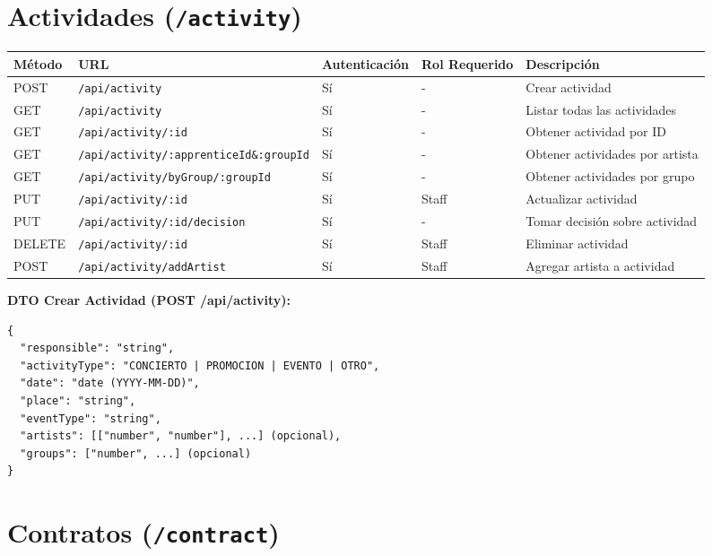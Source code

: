 \documentclass[11pt]{article}
\begin{document}
\section{Actividades (\texttt{/activity})}

\begin{longtable}{lllll}
\toprule
\textbf{Método} & \textbf{URL} & \textbf{Autenticación} & \textbf{Rol Requerido} & \textbf{Descripción} \\
\midrule
\endhead
POST & \texttt{/api/activity} & Sí & - & Crear actividad \\
GET & \texttt{/api/activity} & Sí & - & Listar todas las actividades \\
GET & \texttt{/api/activity/:id} & Sí & - & Obtener actividad por ID \\
GET & \texttt{/api/activity/:apprenticeId\&:groupId} & Sí & - & Obtener actividades por artista \\
GET & \texttt{/api/activity/byGroup/:groupId} & Sí & - & Obtener actividades por grupo \\
PUT & \texttt{/api/activity/:id} & Sí & Staff & Actualizar actividad \\
PUT & \texttt{/api/activity/:id/decision} & Sí & - & Tomar decisión sobre actividad \\
DELETE & \texttt{/api/activity/:id} & Sí & Staff & Eliminar actividad \\
POST & \texttt{/api/activity/addArtist} & Sí & Staff & Agregar artista a actividad \\
\bottomrule
\end{longtable}

\textbf{DTO Crear Actividad (POST /api/activity):}
\begin{Verbatim}
{
  "responsible": "string",
  "activityType": "CONCIERTO | PROMOCION | EVENTO | OTRO",
  "date": "date (YYYY-MM-DD)",
  "place": "string",
  "eventType": "string",
  "artists": [["number", "number"], ...] (opcional),
  "groups": ["number", ...] (opcional)
}
\end{Verbatim}

\section{Contratos (\texttt{/contract})}
\end{document}
